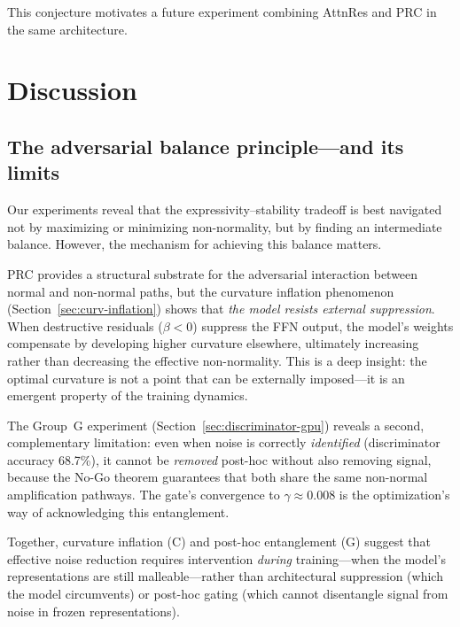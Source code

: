\documentclass[11pt,a4paper]{article}
\theoremstyle{definition}
\begin{document}
This conjecture motivates a future experiment combining AttnRes and PRC
in the same architecture.

\section{Discussion}
\label{sec:discussion}

\subsection{The adversarial balance principle---and its limits}

Our experiments reveal that the expressivity--stability
tradeoff is best navigated not by maximizing or minimizing
non-normality, but by finding an intermediate balance.
However, the mechanism for achieving this balance matters.

PRC provides a structural substrate for the adversarial
interaction between normal and non-normal paths, but the
curvature inflation phenomenon (Section~\ref{sec:curv-inflation})
shows that \emph{the model resists external suppression}. When
destructive residuals ($\beta < 0$) suppress the FFN output,
the model's weights compensate by developing higher curvature
elsewhere, ultimately increasing rather than decreasing the
effective non-normality. This is a deep insight: the optimal
curvature is not a point that can be externally imposed---it is
an emergent property of the training dynamics.

The Group~G experiment (Section~\ref{sec:discriminator-gpu})
reveals a second, complementary limitation: even when noise
is correctly \emph{identified} (discriminator accuracy 68.7\%),
it cannot be \emph{removed} post-hoc without also removing
signal, because the No-Go theorem guarantees that both share
the same non-normal amplification pathways. The gate's
convergence to $\gamma \approx 0.008$ is the optimization's
way of acknowledging this entanglement.

Together, curvature inflation (C) and post-hoc entanglement (G)
suggest that effective noise reduction requires intervention
\emph{during} training---when the model's representations are
still malleable---rather than architectural suppression (which
the model circumvents) or post-hoc gating (which cannot
disentangle signal from noise in frozen representations).
\end{document}
